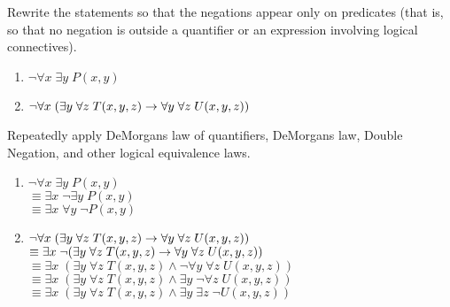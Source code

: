 \begin{questions}
 Rewrite the statements so that the negations appear only on predicates (that is, so that no negation is outside a quantifier or an expression involving logical connectives).
  \begin{enumerate}[label=(\alph*),itemsep=0pt,parsep=0pt,
      topsep=0pt,partopsep=0pt]
      \item $\neg \forall x\; \exists y\; P(x,y)$
      \item $\neg \forall x\; (\exists y\; \forall z\; T(x,y,z) \rightarrow \forall y\; \forall z\; U(x,y,z))$
    \end{enumerate}
    \ifprintanswers
        \vspace{-12pt}
    \fi
  \begin{solution} Repeatedly apply DeMorgans law of quantifiers, DeMorgans law, Double Negation, and other logical equivalence laws.
    \begin{enumerate}[label=(\alph*),itemsep=0pt,parsep=0pt,
        topsep=0pt,partopsep=0pt]
        \item $\neg \forall x\; \exists y\; P(x,y)$ \\
          $ \equiv \exists x\; \neg \exists y\; P(x,y)$ \\
          $ \equiv \exists x\; \forall y\; \neg P(x,y)$ 
          
          
        \item $\neg \forall x\; (\exists y\; \forall z\; T(x,y,z) \rightarrow \forall y\; \forall z\; U(x,y,z))$ \\
          $ \equiv \exists x\; \neg (\exists y\; \forall z\; T(x,y,z) \rightarrow \forall y\; \forall z\; U(x,y,z))$ \\
          $ \equiv \exists x\; (\exists y\; \forall z\; T(x,y,z) \wedge \neg \forall y\; \forall z\; U(x,y,z))$ \\
          $ \equiv \exists x\; (\exists y\; \forall z\; T(x,y,z) \wedge \exists y\; \neg \forall z\; U(x,y,z))$ \\
          $ \equiv \exists x\; (\exists y\; \forall z\; T(x,y,z) \wedge \exists y\; \exists z\; \neg U(x,y,z))$ \\
      \end{enumerate}
  \end{solution}





\end{questions}
